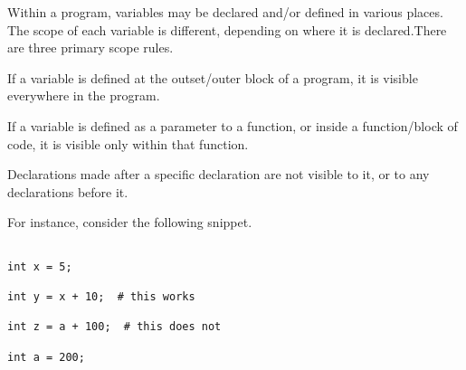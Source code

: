 

Within a program, variables may be declared and/or defined  in various places. The scope of each variable is different, depending on where it is declared.There are three primary scope rules.

If a variable is defined at the outset/outer block of a program, it is visible everywhere in the program.

If a variable is defined as a parameter to a function, or inside a function/block of code, it is visible only within that function.

Declarations made after a specific declaration are not visible to it, or to any declarations before it.

For instance, consider the following snippet.

\begin{lstlisting}

int x = 5;

int y = x + 10;  # this works

int z = a + 100;  # this does not

int a = 200; 
\end{lstlisting}